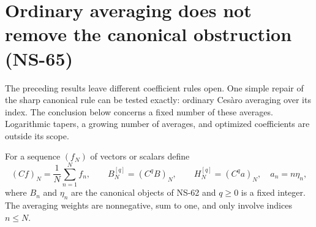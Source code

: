 \section{Ordinary averaging does not remove the canonical obstruction (NS-65)}
\label{sec:ns65-cesaro}

The preceding results leave different coefficient rules open. One simple
repair of the sharp canonical rule can be tested exactly: ordinary
Ces\`aro averaging over its index. The conclusion below concerns a fixed
number of these averages. Logarithmic tapers, a growing number of averages,
and optimized coefficients are outside its scope.

For a sequence $(f_N)$ of vectors or scalars define
\[
 (Cf)_N=\frac1N\sum_{n=1}^Nf_n,\qquad
 B_N^{[q]}=(C^qB)_N,\qquad
 H_N^{[q]}=(C^q a)_N,\quad a_n=n\eta_n,
\]
where $B_n$ and $\eta_n$ are the canonical objects of NS-62 and
$q\geq0$ is a fixed integer. The averaging weights are nonnegative,
sum to one, and only involve indices $n\leq N$.

